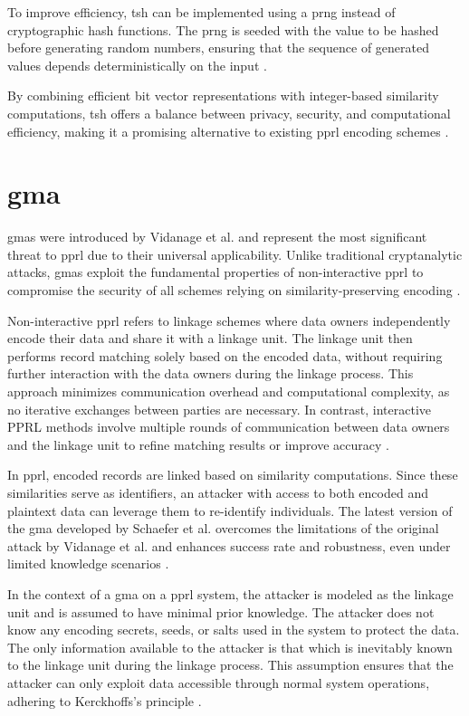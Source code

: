 To improve efficiency, \ac{tsh} can be implemented using a \ac{prng} instead of cryptographic hash functions.
The \ac{prng} is seeded with the value to be hashed before generating random numbers, ensuring that the sequence of generated values depends deterministically on the input \cite{ranbaduge2020secure}.

By combining efficient bit vector representations with integer-based similarity computations, \ac{tsh} offers a balance between privacy, security, and computational efficiency, making it a promising alternative to existing \ac{pprl} encoding schemes \cite{vidanage2020graph, ranbaduge2020secure}.

\section{\ac{gma}} \label{sec:gma}

\ac{gma}s  were introduced by Vidanage et al. \cite{vidanage2020graph} and represent the most significant threat to \ac{pprl} due to their universal applicability.
Unlike traditional cryptanalytic attacks, \ac{gma}s exploit the fundamental properties of non-interactive \ac{pprl} to compromise the security of all schemes relying on similarity-preserving encoding \cite{schaefer2024}.


Non-interactive \ac{pprl} refers to linkage schemes where data owners independently encode their data and share it with a linkage unit.
The linkage unit then performs record matching solely based on the encoded data, without requiring further interaction with the data owners during the linkage process.
This approach minimizes communication overhead and computational complexity, as no iterative exchanges between parties are necessary.
In contrast, interactive PPRL methods involve multiple rounds of communication between data owners and the linkage unit to refine matching results or improve accuracy \cite{kum2014privacy}.

In \ac{pprl}, encoded records are linked based on similarity computations.
Since these similarities serve as identifiers, an attacker with access to both encoded and plaintext data can leverage them to re-identify individuals.
The latest version of the \ac{gma} developed by Schaefer et al. \cite{schaefer2024} overcomes the limitations of the original attack by Vidanage et al. \cite{vidanage2020graph} and enhances success rate and robustness, even under limited knowledge scenarios \cite{schaefer2024}.

In the context of a \ac{gma} on a \ac{pprl} system, the attacker is modeled as the linkage unit and is assumed to have minimal prior knowledge.
The attacker does not know any encoding secrets, seeds, or salts used in the system to protect the data.
The only information available to the attacker is that which is inevitably known to the linkage unit during the linkage process.
This assumption ensures that the attacker can only exploit data accessible through normal system operations, adhering to Kerckhoffs's principle \cite{schaefer2024}.


